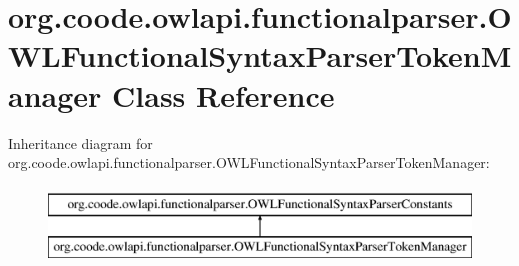 \hypertarget{classorg_1_1coode_1_1owlapi_1_1functionalparser_1_1_o_w_l_functional_syntax_parser_token_manager}{\section{org.\-coode.\-owlapi.\-functionalparser.\-O\-W\-L\-Functional\-Syntax\-Parser\-Token\-Manager Class Reference}
\label{classorg_1_1coode_1_1owlapi_1_1functionalparser_1_1_o_w_l_functional_syntax_parser_token_manager}
}
Inheritance diagram for org.\-coode.\-owlapi.\-functionalparser.\-O\-W\-L\-Functional\-Syntax\-Parser\-Token\-Manager\-:\begin{figure}[H]
\begin{center}
\leavevmode
\includegraphics[height=2.000000cm]{classorg_1_1coode_1_1owlapi_1_1functionalparser_1_1_o_w_l_functional_syntax_parser_token_manager}
\end{center}
\end{figure}
